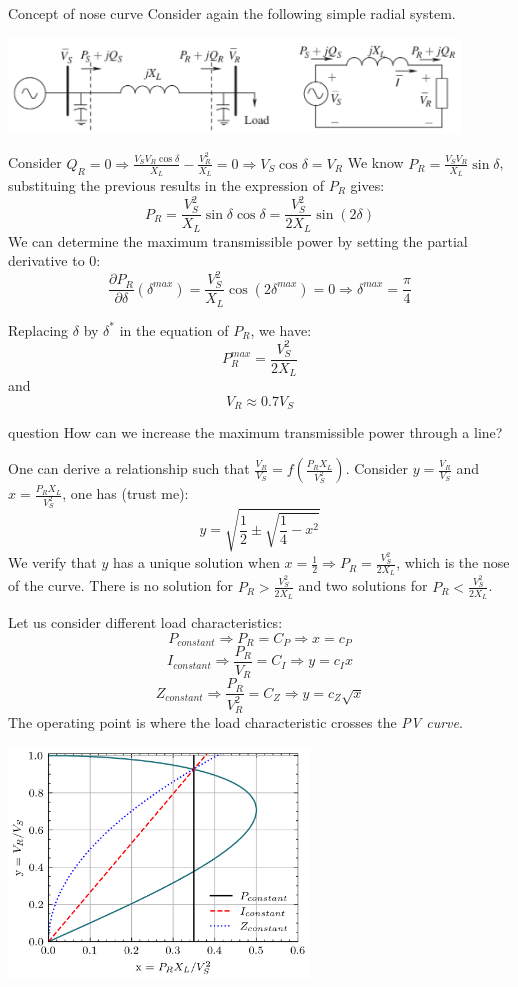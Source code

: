 \begin{frame}[allowframebreaks]{Concept of nose curve}
Consider again the following simple radial system.
\begin{center}
\includegraphics[width=0.9\textwidth]{images/RadialSystem.png}
\end{center}
Consider $Q_R = 0 \Rightarrow \frac{V_S V_R \cos \delta}{X_L} - \frac{V^2_R}{X_L} = 0 \Rightarrow V_S \cos \delta = V_R$
We know $P_R = \frac{V_SV_R}{X_L}\sin \delta$, substituing the previous results in the expression of $P_R$ gives:
$$P_R = \frac{V_S^2}{X_L}\sin \delta \cos \delta = \frac{V_S^2}{2 X_L}\sin (2\delta)$$
We can determine the maximum transmissible power by setting the partial derivative to 0:
$$\frac{\partial P_R}{\partial \delta}(\delta^{max}) = \frac{V_S^2}{X_L}\cos (2\delta^{max}) = 0 \Rightarrow \delta^{max} = \frac{\pi}{4}$$


Replacing $\delta$ by $\delta^*$ in the equation of $P_R$, we have:
$$P_{R}^{max} = \frac{V_S^2}{2 X_L}$$
and
$$V_R \approx 0.7 V_S$$

\begin{block}{question}
    How can we increase the maximum transmissible power through a line?
\end{block}    

One can derive a relationship such that $\frac{V_R}{V_S} = f(\frac{P_R X_L}{V_S^2})$. Consider $y = \frac{V_R}{V_S}$ and $x = \frac{P_R X_L}{V_S^2}$, one has (trust me):
$$y = \sqrt{\frac{1}{2}\pm \sqrt{\frac{1}{4}-x^2}}$$
We verify that $y$ has a unique solution when $x = \frac{1}{2} \Rightarrow P_R = \frac{V_S^2}{2 X_L}$, which is the nose of the curve. There is no solution for $P_R > \frac{V_S^2}{2 X_L}$ and two solutions for $P_R < \frac{V_S^2}{2 X_L}$.


Let us consider different load characteristics:
$$P_{constant} \Rightarrow P_R = C_P \Rightarrow x = c_P$$
$$I_{constant} \Rightarrow \frac{P_R}{V_R} = C_I \Rightarrow y = c_I x$$
$$Z_{constant} \Rightarrow \frac{P_R}{V^2_R} = C_Z \Rightarrow y = c_Z \sqrt{x}$$
The operating point is where the load characteristic crosses the \emph{PV curve}.
\begin{center}
\includegraphics[width=0.6\textwidth]{images/NoseCurve.png}
\end{center}
\end{frame}


